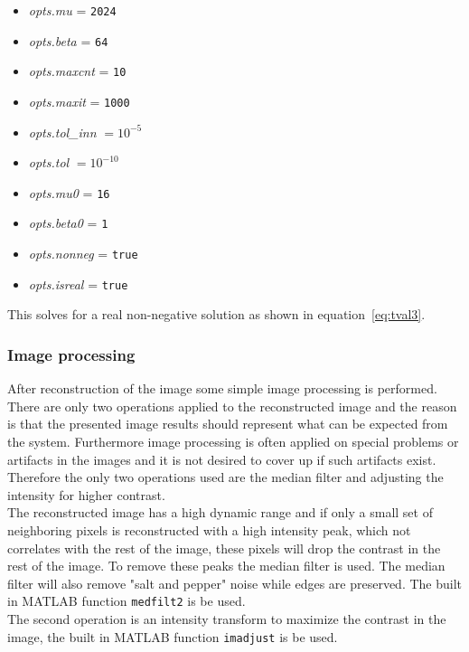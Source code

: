 \begin{itemize}
\item \textit{opts.mu} = \texttt{2024}
\item \textit{opts.beta} = \texttt{64}
\item \textit{opts.maxcnt} = \texttt{10}
\item \textit{opts.maxit} = \texttt{1000}
\item \textit{opts.tol\_inn} $= 10^{-5}$
\item \textit{opts.tol} $= 10^{-10}$ 
\item \textit{opts.mu0} = \texttt{16} 
\item \textit{opts.beta0} = \texttt{1}
\item \textit{opts.nonneg} = \texttt{true}
\item \textit{opts.isreal} = \texttt{true}	
\end{itemize} 

This solves for a real non-negative solution as shown in equation~\ref{eq:tval3}. 


\subsubsection{Image processing}
\label{sec:ip}
After reconstruction of the image some simple image processing is performed. There are only two operations applied to the reconstructed image and the reason is that the presented image results should represent what can be expected from the system. Furthermore image processing is often applied on special problems or artifacts in the images and it is not desired to cover up if such artifacts exist. Therefore the only two operations used are the median filter and adjusting the intensity for higher contrast.\\[0.1in]

The reconstructed image has a high dynamic range and if only a small set of neighboring pixels is reconstructed with a high intensity peak, which not correlates with the rest of the image, these pixels will drop the contrast in the rest of the image. To remove these peaks the median filter is used. The median filter will also remove "salt and pepper" noise while edges are preserved. The built in MATLAB function \texttt{medfilt2} is be used.\\[0.1in]

The second operation is an intensity transform to maximize the contrast in the image, the built in MATLAB function \texttt{imadjust} is be used.   


